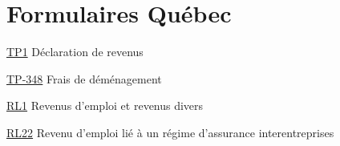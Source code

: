 \chapter*{Formulaires Québec \qct}

\href{https://www.revenuquebec.ca/fr/services-en-ligne/formulaires-et-publications/details-courant/tp-1/}{TP1}
Déclaration de revenus

\href{https://www.revenuquebec.ca/fr/services-en-ligne/formulaires-et-publications/details-courant/tp-348/}{TP-348}
Frais de déménagement 

\href{https://www.revenuquebec.ca/fr/services-en-ligne/formulaires-et-publications/details-courant/rl-1/}{RL1}
Revenus d'emploi et revenus divers

\href{https://www.revenuquebec.ca/fr/services-en-ligne/formulaires-et-publications/details-courant/rl-22/}{RL22}
Revenu d'emploi lié à un régime d'assurance interentreprises

